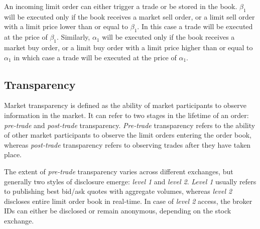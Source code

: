An incoming limit order can either trigger a trade or be stored in the book.    $\beta_1$ will be executed only if the book receives a market sell order, or a limit sell order with a limit price lower than or equal to $\beta_1$. In this case a trade will be executed at the price of $\beta_1$. Similarly, $\alpha_1$ will be executed only if the book receives a market buy order, or a limit buy order with a limit price higher than or equal to $\alpha_1$ in which case a trade will be executed at the price of $\alpha_1$.

\subsection{Transparency}
Market transparency is defined as the ability of market participants to observe information in the market. It can refer to two stages in the lifetime of an order: \textit{pre-trade} and \textit{post-trade} transparency. \textit{Pre-trade} transparency refers to the ability of other market participants to observe the limit orders entering the order book, whereas \textit{post-trade} transparency refers to observing trades after they have taken place.

The extent of \textit{pre-trade} transparency varies across different exchanges, but generally two styles of disclosure emerge: \textit{level 1} and \textit{level 2}. \textit{Level 1} usually refers to publishing best bid/ask quotes  with aggregate volumes, whereas \textit{level 2} discloses entire limit order book in real-time. In case of \textit{level 2} access, the broker IDs can either be disclosed or remain anonymous, depending on the stock exchange.














